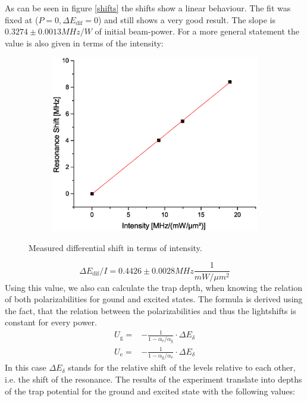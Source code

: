 As can be seen in figure \ref{shifts} the shifts show a linear behaviour. The fit was fixed at ($P=0, \Delta E_\mathrm{dif}=0$) and still shows a very good result. The slope is $0.3274\pm 0.0013\unit{MHz/W}$ of initial beam-power. For a more general statement the value is also given in terms of the intensity:
\begin{figure}[h]
\centering
\begin{subfigure}[b]{0.8\textwidth}
                \includegraphics[width=\textwidth]{shiftintens}
\end{subfigure}
\caption{Measured differential shift in terms of intensity.}
\label{shiftintens}
\end{figure}
\begin{equation}
\Delta E_\mathrm{dif}/I=0.4426\pm 0.0028\unit{MHz\frac{1}{mW/\mu m^2}}
\end{equation}
Using this value, we also can calculate the trap depth, when knowing the relation of both polarizabilities for gound and excited states. The formula is derived using the fact, that the relation between the polarizabilities and thus the lightshifts is constant for every power.
\begin{align}
U_{\mathrm{g}}=&-\frac{1}{1-\alpha_{\mathrm{e}}/\alpha_{\mathrm{g}}}\cdot \Delta E_\delta\\
U_{\mathrm{e}}=&-\frac{1}{1-\alpha_{\mathrm{g}}/\alpha_{\mathrm{e}}}\cdot \Delta E_\delta
\end{align}
In this case $\Delta E_\delta$ stands for the relative shift of the levels relative to each other, i.e. the shift of the resonance. The results of the experiment translate into depths of the trap potential for the ground and excited state with the following values:
